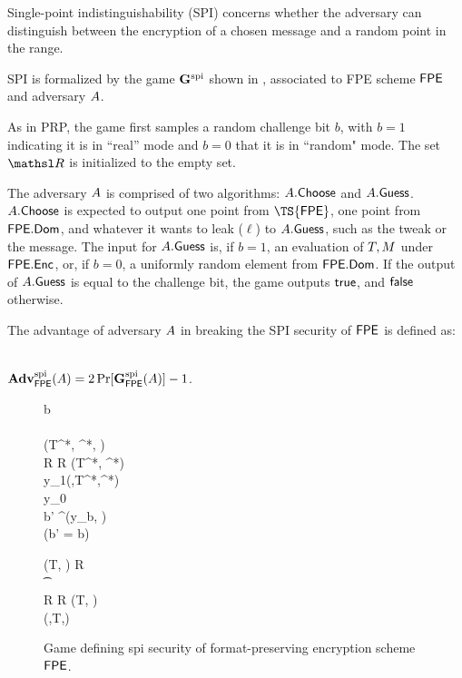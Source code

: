 

Single-point indistinguishability (SPI) concerns whether the adversary can distinguish between the encryption of a chosen message and a random point in the range. \

	SPI is formalized by the game $\mathbf{G}^{\rm spi}_{}$ shown in , associated to FPE scheme $\mathsf{FPE}$ and adversary $A$.\
    
   As in PRP, the game first samples a random challenge bit $b$, with $b=1$ indicating it is in ``real'' mode and $b=0$ that it is in ``random" mode. The set $\setfont{R}$ is initialized to the empty set. \
   
   The adversary $A$ is comprised of two algorithms: $A.\mathsf{Choose}$ and $A.\mathsf{Guess}$. $A.\mathsf{Choose}$ is expected to output one point from $\TS{\FPE}$, one point from $\mathsf{FPE}.\mathsf{Dom}$, and whatever it wants to leak ($\ell$) to $A.\mathsf{Guess}$, such as the tweak or the message. The input for $A.\mathsf{Guess}$ is, if $b=1$, an evaluation of $T, M$ under $\mathsf{FPE}.\mathsf{Enc}$, or, if $b=0$, a uniformly random element from $\mathsf{FPE}.\mathsf{Dom}$. If the output of $A.\mathsf{Guess}$ is equal to the challenge bit, the game outputs $\mathsf{true}$, and $\mathsf{false}$ otherwise.\
   
    The advantage of adversary $A$ in breaking the SPI security of $\mathsf{FPE}$ is defined as: \
     \begin{center}
    $\mathbf{Adv}^{\rm spi}_{\mathsf{FPE}}(A) = 2\Pr[\mathbf{G}^{\rm spi}_{\mathsf{FPE}}(A)]- 1$.\\
     \end{center}
    
  
\begin{figure} [t]
\begin{center}
\fbox
{
\begin{pchstack}
  {
    b \getsr \bits \\
    \key \getsr \Keys{\FPE}  \\
    (T^*, \msg^*, \ell) \getsr \choice{\advA} \\
    R \gets R \cup (T^*, \msg^*) \\
    y_1\gets \Enc{\FPE}(\key,T^*,\msg^*)  \\
    y_0\getsr \Dom{\FPE} \\
    b' \getsr \guess{\advA}^{\EncO}(y_b, \ell) \\
    \pcreturn (b' = b)
  }
  
    \pchspace
    
  {
    \pcif (T, \msg) \in R \pcthen \\
    \t \pcreturn \bot \\
    R \gets R \cup (T, \msg) \\
    \pcreturn \Enc{\FPE}(\key,T,\msg)
  }
\end{pchstack}
}
\end{center}
\vspace{-2ex}
\caption{ Game defining spi security of format-preserving encryption scheme $\mathsf{FPE}$.}
\label{fig-fpe-spi}
\hrulefill
\end{figure}